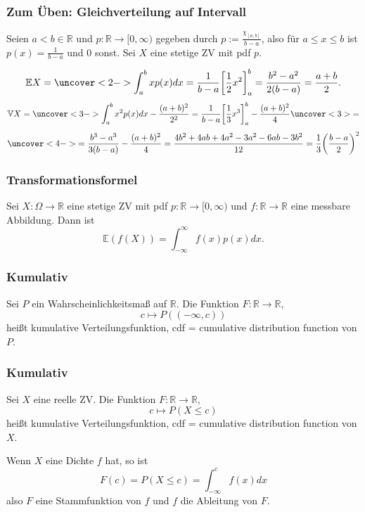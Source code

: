 \begin{frame}
  \frametitle{Zum Üben: Gleichverteilung auf Intervall}
  Seien $a < b \in \mathbb{R}$ und $p \colon \mathbb{R} \to [0,\infty)$ gegeben durch $p := \frac{\chi_{[a,b]}}{b-a}$, also für $a \leq x \leq b$ ist $p(x) = \frac{1}{b-a}$ und $0$ sonst. Sei $X$ eine stetige ZV mit pdf $p$.

  \[\mathbb{E}X = \uncover<2->{ \int_a^b xp(x) dx = \frac{1}{b-a} {\left[ \frac{1}{2} x^2 \right]}_a^b = \frac{b^2-a^2}{2(b-a)} = \frac{a+b}{2}.}\]
  \[\mathbb{V}X = \uncover<3->{\int_a^b x^2 p(x) dx - \frac{(a+b)^2}{2^2} = \frac{1}{b-a} {\left[ \frac{1}{3} x^3 \right]}_a^b - \frac{(a+b)^2}{4} }\uncover<3>{ = }\]
  \[\uncover<4->{ = \frac{b^3-a^3}{3(b-a)} - \frac{(a+b)^2}{4} = \frac{4b^2 + 4ab + 4a^2 - 3a^2 - 6ab -3b^2}{12} = \frac{1}{3}{\left(\frac{b-a}{2}\right)}^2}\]
\end{frame}

\begin{frame}
  \frametitle{Transformationsformel}
  \begin{lemma}
    Sei $X \colon \Omega \to \mathbb{R}$ eine stetige ZV mit pdf $p \colon \mathbb{R} \to [0,\infty)$ und $f \colon \mathbb{R} \to \mathbb{R}$ eine messbare Abbildung.
    Dann ist
    \[\mathbb{E}(f(X)) = \int_{-\infty}^{\infty} f(x) p(x) dx.\]
  \end{lemma}
\end{frame}

\begin{frame}
  \frametitle{Kumulativ}
  \begin{definition}
  Sei $P$ ein Wahrscheinlichkeitsmaß auf $\mathbb{R}$.
  Die Funktion $F \colon \mathbb{R} \to \mathbb{R}$,
  \[c \mapsto P((-\infty, c))\]
  heißt \alert{kumulative Verteilungsfunktion}, \alert{cdf = cumulative distribution function} von $P$.
\end{definition}
\end{frame}

\begin{frame}
  \frametitle{Kumulativ}
  \begin{definition}
  Sei $X$ eine reelle ZV.
  Die Funktion $F \colon \mathbb{R} \to \mathbb{R}$,
  \[c \mapsto P(X \leq c)\]
  heißt \alert{kumulative Verteilungsfunktion}, \alert{cdf = cumulative distribution function} von $X$.
\end{definition}
Wenn $X$ eine Dichte $f$ hat, so ist
\[F(c) = P(X \leq c) = \int_{-\infty}^c f(x) dx\]
also $F$ eine Stammfunktion von $f$ und $f$ die Ableitung von $F$.
\end{frame}

